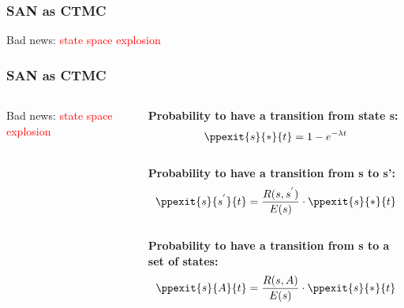 \begin{frame}
\frametitle{SAN as CTMC}
\begin{figure}[p]
\centering
\scalebox{0.4}{

}

\label{ex-bifurcations}
\end{figure}
Bad news: \textcolor{red}{state space explosion}
\end{frame}

\begin{frame}
\frametitle{SAN as CTMC}
\begin{columns}
 \begin{column}{0.5\textwidth}
 \begin{figure}[p]
\centering
\scalebox{0.25}{

}

\label{ex-bifurcations}
\end{figure}
Bad news: \textcolor{red}{state space explosion}
  
 \end{column}
 
 \begin{column}{0.5\textwidth}
  \textbf{Probability to have a transition from state s:}
  $$\ppexit{s}{*}{t} = 1-e^{-\lambda t}$$ \\
  \medskip
  \textbf{Probability to have a transition from s to s':}
  $$\ppexit{s}{s^{'}}{t} = \frac{R (s,s^{'})}{E (s)} \cdot \ppexit{s}{*}{t}$$\\
  \medskip
  \textbf{Probability to have a transition from s to a set of states:}
  $$\ppexit{s}{A}{t} = \frac{R (s,A)}{E (s)} \cdot \ppexit{s}{*}{t}$$ \\
 \end{column}

\end{columns}

\end{frame}


